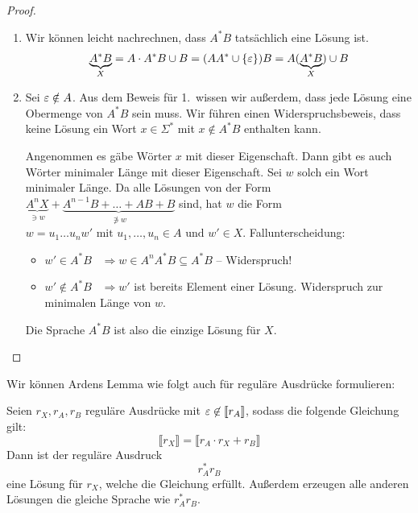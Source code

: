 \begin{proof}
\hfill \vspace{-\baselineskip} \\
\begin{enumerate}
 \item Wir können leicht nachrechnen, dass $A^*B$ tatsächlich eine Lösung ist.
 $$ \underbrace{A^*B}_X = A\cdot A^*B \cup B = (AA^*\cup \{\varepsilon\})B = A(\underbrace{A^*B}_X)\cup B$$
 \item Sei $\varepsilon \notin A$.
 Aus dem Beweis für 1.\ wissen wir außerdem, dass jede Lösung eine Obermenge von $A^*B$ sein muss.
 Wir führen einen Widerspruchsbeweis, dass keine Lösung ein Wort $x\in\Sigma^*$ mit $x\notin A^*B$ enthalten kann.
 
 Angenommen es gäbe Wörter $x$ mit dieser Eigenschaft. 
 Dann gibt es auch Wörter minimaler Länge mit dieser Eigenschaft.
 Sei $w$ solch ein Wort minimaler Länge.
 Da alle Lösungen von der Form $\underbrace{A^nX}_{\ni w} + \underbrace{A^{n-1}B+\dots +AB+B}_{\not\ni w}$ sind, hat $w$ die Form
 $w = u_1\dots u_n w'\text{ mit } u_1,\dots,u_n\in A\text{ und } w'\in X$.
 Fallunterscheidung:
 \begin{itemize}
  \item $w' \in A^*B$ \ $\Rightarrow w\in A^nA^*B\subseteq A^*B$ -- Widerspruch!
  \item $w' \notin A^*B$ \ $\Rightarrow w'$ ist bereits Element einer Lösung. Widerspruch zur minimalen Länge von $w$.
 \end{itemize}
 Die Sprache $A^*B$ ist also die einzige Lösung für $X$.
 \qedhere
\end{enumerate}
\end{proof}

Wir können Ardens Lemma wie folgt auch für reguläre Ausdrücke formulieren:
\begin{Korollar}
   Seien $r_X,r_A,r_B$ reguläre Ausdrücke mit $\varepsilon \not \in [\![ r_A ]\!]$, sodass die folgende Gleichung gilt:
  \begin{displaymath}
    \llbracket r_X \rrbracket = \llbracket r_A \cdot r_X + r_B \rrbracket
  \end{displaymath}
  Dann ist der reguläre Ausdruck
  \begin{displaymath}
    r_A^*r_B
  \end{displaymath}
  eine Lösung für $r_X$, welche die Gleichung erfüllt. Außerdem erzeugen alle anderen Lösungen die gleiche Sprache wie $r_A^*r_B$.
\end{Korollar}

